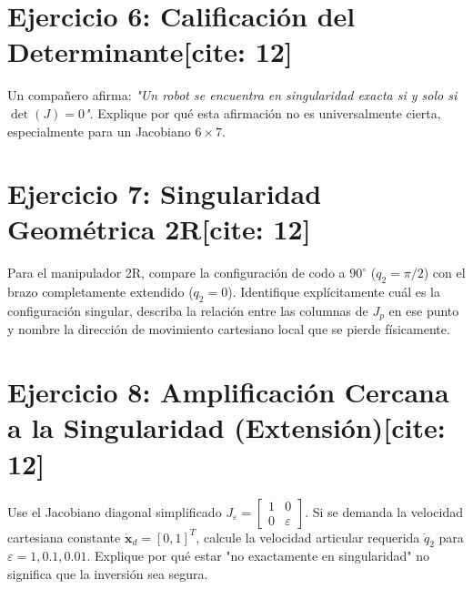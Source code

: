 \documentclass[11pt, a4paper]{article}
\begin{document}
\section*{Ejercicio 6: Calificación del Determinante[cite: 12]}
Un compañero afirma: \textit{"Un robot se encuentra en singularidad exacta si y solo si $\det(J) = 0$"}. Explique por qué esta afirmación no es universalmente cierta, especialmente para un Jacobiano $6 \times 7$.
\vspace{2cm}

\section*{Ejercicio 7: Singularidad Geométrica 2R[cite: 12]}
Para el manipulador 2R, compare la configuración de codo a $90^\circ$ ($q_2 = \pi/2$) con el brazo completamente extendido ($q_2 = 0$). Identifique explícitamente cuál es la configuración singular, describa la relación entre las columnas de $J_p$ en ese punto y nombre la dirección de movimiento cartesiano local que se pierde físicamente.
\vspace{3cm}

\section*{Ejercicio 8: Amplificación Cercana a la Singularidad (Extensión)[cite: 12]}
Use el Jacobiano diagonal simplificado $J_\varepsilon = \begin{bmatrix} 1 & 0 \\ 0 & \varepsilon \end{bmatrix}$. Si se demanda la velocidad cartesiana constante $\dot{\mathbf{x}}_d = [0, 1]^T$, calcule la velocidad articular requerida $\dot{q}_2$ para $\varepsilon = 1, 0.1, 0.01$. Explique por qué estar "no exactamente en singularidad" no significa que la inversión sea segura.
\vspace{3cm}
\end{document}
